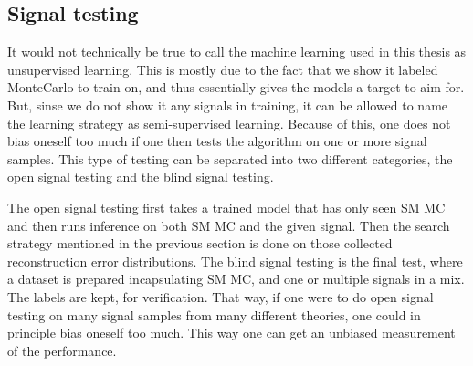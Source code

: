 \subsection*{Signal testing}
It would not technically be true to call the machine learning used in this thesis as unsupervised learning. 
This is mostly due to the fact that we show it labeled MonteCarlo to train on, and thus essentially gives 
the models a target to aim for. But, sinse we do not show it any signals in training, it can be allowed to 
name the learning strategy as semi-supervised learning. Because of this, one does not bias oneself too much 
if one then tests the algorithm on one or more signal samples. This type of testing can be separated into two
different categories, the open signal testing and the blind signal testing. \par 
The open signal testing first takes a trained model that has only seen SM MC and then runs inference on both 
SM MC and the given signal. Then the search strategy mentioned in the previous section is done on those 
collected reconstruction error distributions. The blind signal testing is the final test, where a dataset 
is prepared incapsulating SM MC, and one or multiple signals in a mix. The labels are kept, for verification. 
That way, if one were to do open signal testing on many signal samples from many different theories, one could 
in principle bias oneself too much. This way one can get an unbiased measurement of the performance. 
